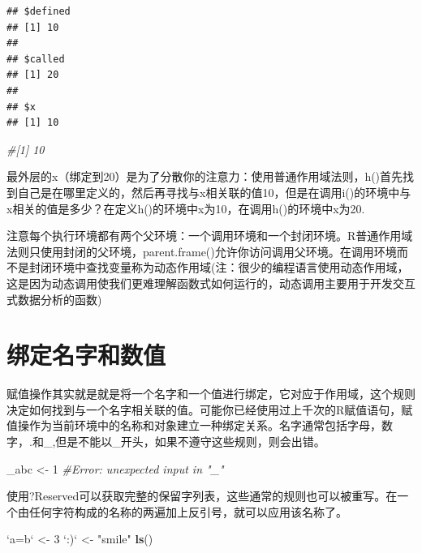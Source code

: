 \documentclass[]{book}
\newenvironment{Shaded}{\begin{snugshade}}{\end{snugshade}}
\newcommand{\KeywordTok}[1]{\textcolor[rgb]{0.13,0.29,0.53}{\textbf{#1}}}
\newcommand{\DataTypeTok}[1]{\textcolor[rgb]{0.13,0.29,0.53}{#1}}
\newcommand{\DecValTok}[1]{\textcolor[rgb]{0.00,0.00,0.81}{#1}}
\newcommand{\StringTok}[1]{\textcolor[rgb]{0.31,0.60,0.02}{#1}}
\newcommand{\CommentTok}[1]{\textcolor[rgb]{0.56,0.35,0.01}{\textit{#1}}}
\newcommand{\NormalTok}[1]{#1}
\begin{document}
\begin{verbatim}
## $defined
## [1] 10
## 
## $called
## [1] 20
## 
## $x
## [1] 10
\end{verbatim}

\begin{Shaded}
\begin{Highlighting}[]
\CommentTok{#[1] 10}
\end{Highlighting}
\end{Shaded}

最外层的x（绑定到20）是为了分散你的注意力：使用普通作用域法则，h()首先找到自己是在哪里定义的，然后再寻找与x相关联的值10，但是在调用i()的环境中与x相关的值是多少？在定义h()的环境中x为10，在调用h()的环境中x为20.

注意每个执行环境都有两个父环境：一个调用环境和一个封闭环境。R普通作用域法则只使用封闭的父环境，parent.frame()允许你访问调用父环境。在调用环境而不是封闭环境中查找变量称为动态作用域(注：很少的编程语言使用动态作用域，这是因为动态调用使我们更难理解函数式如何运行的，动态调用主要用于开发交互式数据分析的函数)

\section{绑定名字和数值}

赋值操作其实就是就是将一个名字和一个值进行绑定，它对应于作用域，这个规则决定如何找到与一个名字相关联的值。可能你已经使用过上千次的R赋值语句，赋值操作为当前环境中的名称和对象建立一种绑定关系。名字通常包括字母，数字，.和\_,但是不能以\_开头，如果不遵守这些规则，则会出错。

\begin{Shaded}
\begin{Highlighting}[]
\NormalTok{_abc <-}\StringTok{ }\DecValTok{1}
\CommentTok{#Error: unexpected input in "_"}
\end{Highlighting}
\end{Shaded}

使用?Reserved可以获取完整的保留字列表，这些通常的规则也可以被重写。在一个由任何字符构成的名称的两遍加上反引号，就可以应用该名称了。

\begin{Shaded}
\begin{Highlighting}[]
\StringTok{`}\DataTypeTok{a=b}\StringTok{`}\NormalTok{ <-}\StringTok{ }\DecValTok{3}
\StringTok{`}\DataTypeTok{:)}\StringTok{`}\NormalTok{ <-}\StringTok{ "smile"}
\KeywordTok{ls}\NormalTok{()}
\end{Highlighting}
\end{Shaded}
\end{document}
